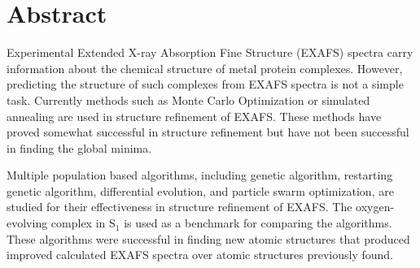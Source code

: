 \thispagestyle{empty}
\section*{Abstract}
\begin{doublespace}
Experimental Extended X-ray Absorption Fine Structure (EXAFS) spectra carry information about the chemical structure of metal protein complexes. However, predicting the structure of such complexes from EXAFS spectra is not a simple task. Currently methods such as Monte Carlo Optimization or simulated annealing are used in structure refinement of EXAFS. These methods have proved somewhat successful in structure refinement but have not been successful in finding the global minima.

Multiple population based algorithms, including genetic algorithm, restarting genetic algorithm, differential evolution, and particle swarm optimization, are studied for their effectiveness in structure refinement of EXAFS. The oxygen-evolving complex in S$_{1}$ is used as a benchmark for comparing the algorithms. These algorithms were successful in finding new atomic structures that produced improved calculated EXAFS spectra over atomic structures previously found.

\end{doublespace}   

